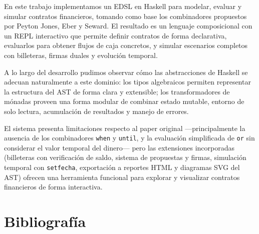 \documentclass[a4paper, 12pt]{article}
\begin{document}
En este trabajo implementamos un EDSL en Haskell para modelar, evaluar y simular contratos financieros, tomando como base los combinadores propuestos por Peyton Jones, Eber y Seward. El resultado es un lenguaje composicional con un REPL interactivo que permite definir contratos de forma declarativa, evaluarlos para obtener flujos de caja concretos, y simular escenarios completos con billeteras, firmas duales y evolución temporal.

A lo largo del desarrollo pudimos observar cómo las abstracciones de Haskell se adecuan naturalmente a este dominio: los tipos algebraicos permiten representar la estructura del AST de forma clara y extensible; los transformadores de mónadas proveen una forma modular de combinar estado mutable, entorno de solo lectura, acumulación de resultados y manejo de errores.

El sistema presenta limitaciones respecto al paper original ---principalmente la ausencia de los combinadores \texttt{when} y \texttt{until}, y la evaluación simplificada de \texttt{or} sin considerar el valor temporal del dinero--- pero las extensiones incorporadas (billeteras con verificación de saldo, sistema de propuestas y firmas, simulación temporal con \texttt{setfecha}, exportación a reportes HTML y diagramas SVG del AST) ofrecen una herramienta funcional para explorar y visualizar contratos financieros de forma interactiva.

\section{Bibliografía}
\end{document}
